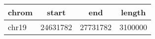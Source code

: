 \documentclass{standalone}
\begin{document}
\begin{tabular}{|l|c|c|c|}
\toprule
chrom & start & end & length \\
\midrule
chr19 & 24631782 & 27731782 & 3100000 \\
\bottomrule
\end{tabular}
\end{document}
